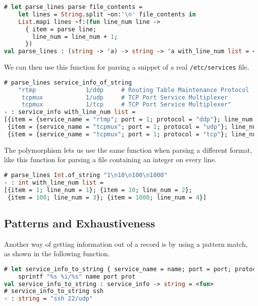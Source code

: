 \begin{lstlisting}[language=Caml]
# let parse_lines parse file_contents =
    let lines = String.split ~on:'\n' file_contents in
    List.mapi lines ~f:(fun line_num line ->
      { item = parse line;
        line_num = line_num + 1;
      })
val parse_lines : (string -> 'a) -> string -> 'a with_line_num list = <fun>
\end{lstlisting}

We can then use this function for parsing a snippet of a real
\passthrough{\lstinline!/etc/services!} file.

\begin{lstlisting}[language=Caml]
# parse_lines service_info_of_string
    "rtmp              1/ddp     # Routing Table Maintenance Protocol
     tcpmux            1/udp     # TCP Port Service Multiplexer
     tcpmux            1/tcp     # TCP Port Service Multiplexer"
- : service_info with_line_num list =
[{item = {service_name = "rtmp"; port = 1; protocol = "ddp"}; line_num = 1};
 {item = {service_name = "tcpmux"; port = 1; protocol = "udp"}; line_num = 2};
 {item = {service_name = "tcpmux"; port = 1; protocol = "tcp"}; line_num = 3}]
\end{lstlisting}

The polymorphism lets us use the same function when parsing a different
format, like this function for parsing a file containing an integer on
every line.

\begin{lstlisting}[language=Caml]
# parse_lines Int.of_string "1\n10\n100\n1000"
- : int with_line_num list =
[{item = 1; line_num = 1}; {item = 10; line_num = 2};
 {item = 100; line_num = 3}; {item = 1000; line_num = 4}]
\end{lstlisting}

\hypertarget{patterns-and-exhaustiveness}{%
\subsection{Patterns and
Exhaustiveness}\label{patterns-and-exhaustiveness}}

Another way of getting information out of a record is by using a pattern
match, as shown in the following function.

\begin{lstlisting}[language=Caml]
# let service_info_to_string { service_name = name; port = port; protocol = prot  } =
    sprintf "%s %i/%s" name port prot
val service_info_to_string : service_info -> string = <fun>
# service_info_to_string ssh
- : string = "ssh 22/udp"
\end{lstlisting}

